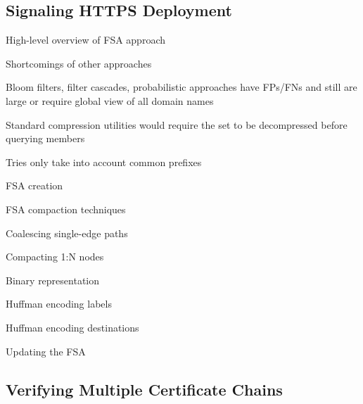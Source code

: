 \subsection{Signaling HTTPS Deployment}
\label{sec:design:signaling}

\begin{compactitem}
\item High-level overview of FSA approach 
\item Shortcomings of other approaches
  \begin{compactitem}
  \item Bloom filters, filter cascades, probabilistic approaches have FPs/FNs
    and still are large or require global view of all domain names
  \item Standard compression utilities would require the set to be decompressed
    before querying members
  \item Tries only take into account common prefixes
  \end{compactitem}
\item FSA creation
\item FSA compaction techniques
  \begin{compactitem}
  \item Coalescing single-edge paths
  \item Compacting 1:N nodes
  \item Binary representation
  \item Huffman encoding labels
  \item Huffman encoding destinations
  \end{compactitem}
\item Updating the FSA
\end{compactitem}

\subsection{Verifying Multiple Certificate Chains}
\label{sec:design:verifying}


